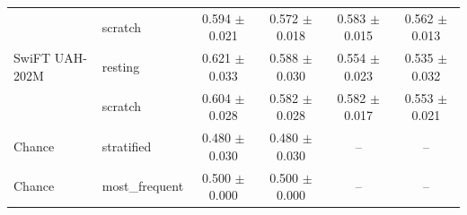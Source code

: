 \begin{table}[H]
{\begin{tabular}{llcccc}
 & scratch & 0.594 $\pm$ 0.021 & 0.572 $\pm$ 0.018 & 0.583 $\pm$ 0.015 & 0.562 $\pm$ 0.013 \\
SwiFT UAH-202M & resting & 0.621 $\pm$ 0.033 & 0.588 $\pm$ 0.030 & 0.554 $\pm$ 0.023 & 0.535 $\pm$ 0.032 \\
 & scratch & 0.604 $\pm$ 0.028 & 0.582 $\pm$ 0.028 & 0.582 $\pm$ 0.017 & 0.553 $\pm$ 0.021 \\
\midrule
Chance & stratified & 0.480 $\pm$ 0.030 & 0.480 $\pm$ 0.030 & -- & -- \\
Chance & most\_frequent & 0.500 $\pm$ 0.000 & 0.500 $\pm$ 0.000 & -- & -- \\
\bottomrule
\end{tabular}%
}
\end{table}